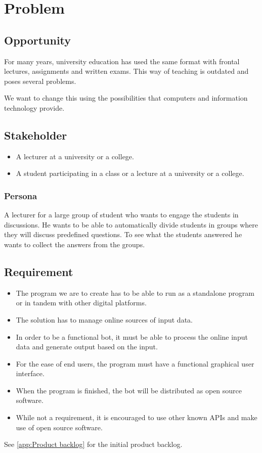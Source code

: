 \section{Problem}

\subsection{Opportunity}
For many years, university education has used the same format with frontal lectures, assignments and written exams. This way of teaching is outdated and poses several problems. 

We want to change this using the possibilities that computers and information technology provide.


\subsection{Stakeholder}
\begin{itemize}
    \item A lecturer at a university or a college.
    \item A student participating in a class or a lecture at a university or a college.
\end{itemize} 

\subsubsection{Persona}
A lecturer for a large group of student who wants to engage the students in discussions. He wants to be able to automatically divide students in groups where they will discuss predefined questions. To see what the students answered he wants to collect the answers from the groups. 

\subsection{Requirement}
\begin{itemize}
    \item The program we are to create has to be able to run as a standalone program or in tandem with other digital platforms.
    \item The solution has to manage online sources of input data.
    \item In order to be a functional bot, it must be able to process the online input data and generate output based on the input.
    \item For the ease of end users, the program must have a functional graphical user interface.
    \item When the program is finished, the bot will be distributed as open source software.
    \item While not a requirement, it is encouraged to use other known APIs and make use of open source software.
\end{itemize}

See \cref{app:Product backlog} for the initial product backlog.